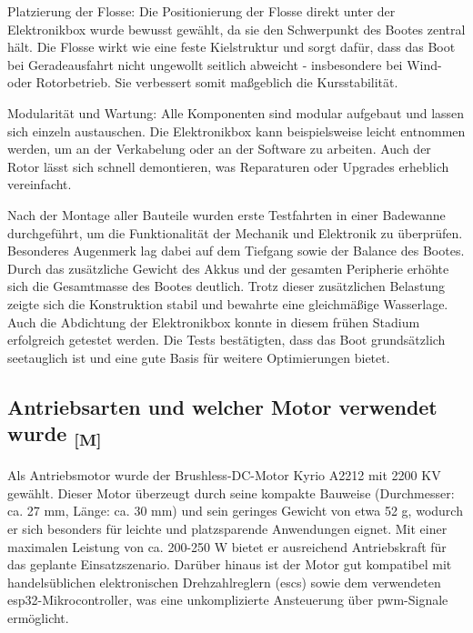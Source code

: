 \documentclass[a4paper,12pt]{article}
\begin{document}
Platzierung der Flosse: Die Positionierung der Flosse direkt unter der Elektronikbox wurde bewusst gewählt, da sie den Schwerpunkt des Bootes zentral hält. Die Flosse wirkt wie eine feste Kielstruktur und sorgt dafür, dass das Boot bei Geradeausfahrt nicht ungewollt seitlich abweicht - insbesondere bei Wind- oder Rotorbetrieb. Sie verbessert somit maßgeblich die Kursstabilität.\newline

Modularität und Wartung: Alle Komponenten sind modular aufgebaut und lassen sich einzeln austauschen. Die Elektronikbox kann beispielsweise leicht entnommen werden, um an der Verkabelung oder an der Software zu arbeiten. Auch der Rotor lässt sich schnell demontieren, was Reparaturen oder Upgrades erheblich vereinfacht.


Nach der Montage aller Bauteile wurden erste Testfahrten in einer Badewanne durchgeführt, um die Funktionalität der Mechanik und Elektronik zu überprüfen. Besonderes Augenmerk lag dabei auf dem Tiefgang sowie der Balance des Bootes. Durch das zusätzliche Gewicht des Akkus und der gesamten Peripherie erhöhte sich die Gesamtmasse des Bootes deutlich. Trotz dieser zusätzlichen Belastung zeigte sich die Konstruktion stabil und bewahrte eine gleichmäßige Wasserlage. Auch die Abdichtung der Elektronikbox konnte in diesem frühen Stadium erfolgreich getestet werden. Die Tests bestätigten, dass das Boot grundsätzlich seetauglich ist und eine gute Basis für weitere Optimierungen bietet.



\newpage
\subsection{\texorpdfstring{Antriebsarten und welcher Motor verwendet wurde \textsubscript{[M]}}{Antriebsarten und welcher Motor verwendet wurde [M]}}
\label{sec:Antriebsarten}

Als Antriebsmotor wurde der Brushless-DC-Motor Kyrio A2212 mit 2200 KV gewählt. Dieser Motor überzeugt durch seine kompakte Bauweise (Durchmesser: ca. 27 mm, Länge: ca. 30 mm) und sein geringes Gewicht von etwa 52 g, wodurch er sich besonders für leichte und platzsparende Anwendungen eignet. Mit einer maximalen Leistung von ca. 200-250 W bietet er ausreichend Antriebskraft für das geplante Einsatzszenario. Darüber hinaus ist der Motor gut kompatibel mit handelsüblichen elektronischen Drehzahlreglern (\gls{esc}s) sowie dem verwendeten \gls{esp32}-Mikrocontroller, was eine unkomplizierte Ansteuerung über \gls{pwm}-Signale ermöglicht.\cite{Brushless_DC}
\end{document}
